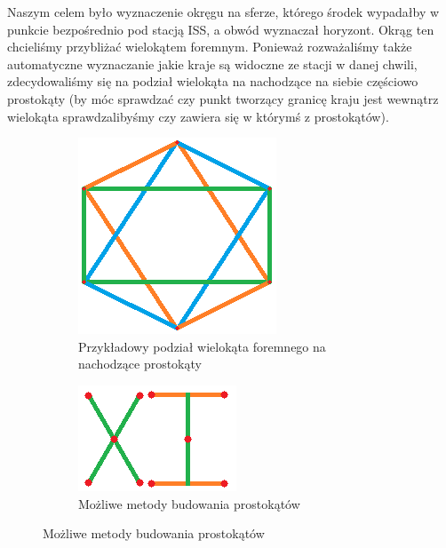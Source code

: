 Naszym celem było wyznaczenie okręgu na sferze, którego środek wypadałby w punkcie bezpośrednio
pod stacją ISS, a obwód wyznaczał horyzont. Okrąg ten chcieliśmy przybliżać wielokątem foremnym.
Ponieważ rozważaliśmy także automatyczne wyznaczanie jakie kraje są widoczne ze stacji w danej
chwili, zdecydowaliśmy się na podział wielokąta na nachodzące na siebie częściowo prostokąty
(by móc sprawdzać czy punkt tworzący granicę kraju jest wewnątrz wielokąta sprawdzalibyśmy czy
zawiera się w którymś z prostokątów).

\begin{figure}[H]
    \begin{subfigure}{0.5\textwidth}
        \centering
        \includegraphics[width=0.9\linewidth]{photos/circle.png}
        \caption{Przykładowy podział wielokąta foremnego na nachodzące prostokąty}
    \end{subfigure}
    \begin{subfigure}{0.5\textwidth}
        \centering
        \includegraphics[width=0.9\linewidth]{photos/models.png}
        \caption{Możliwe metody budowania prostokątów}
    \end{subfigure}
\end{figure}

